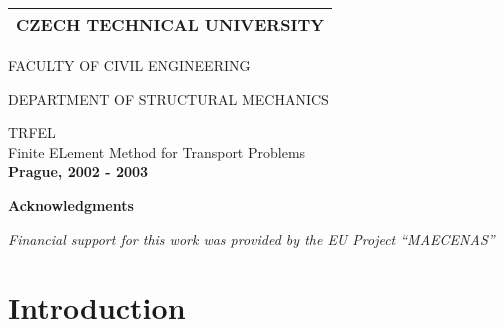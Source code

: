 \begin{titlepage}
\vspace{-10mm}
\begin{center}
\begin{tabular}{c}
\textup {\LARGE CZECH TECHNICAL UNIVERSITY}\\
\hline
\end{tabular}
\end{center}
\begin{center}
\vspace{-3mm}
\textup {\large FACULTY OF CIVIL ENGINEERING}
\vspace{20mm}\end{center}
\begin{figure}[h]
\begin{center}
\end{center}
\end{figure}
\begin{center}
\vspace{-3mm}
\begin{center}
\textup {\large DEPARTMENT OF STRUCTURAL MECHANICS}\\
\end{center}
\vspace{25mm}
\textrm {\Huge TRFEL}\\
\vspace{20mm}
\textrm {\LARGE Finite ELement Method for Transport Problems}\\
\vspace{60mm}
{\Large \bf Prague, 2002 - 2003}
\end{center}
\end{titlepage}

\newpage
\begin{center}
{\huge \bf Acknowledgments}
\end{center}
\vspace{30mm}
{\it Financial support for this work was provided by the EU Project ``MAECENAS''}




\chapter{Introduction}

